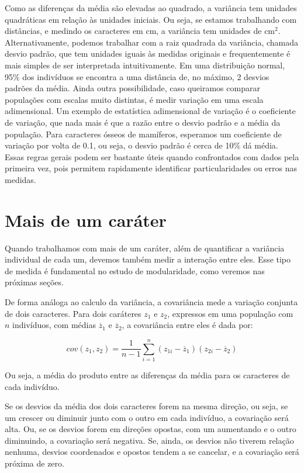 \documentclass[portuges,]{tufte-handout}
\begin{document}
Como as diferenças da média são elevadas ao quadrado, a variância tem
unidades quadráticas em relação às unidades iniciais. Ou seja, se
estamos trabalhando com distâncias, e medindo os caracteres em cm, a
variância tem unidades de cm$^2$. Alternativamente, podemos trabalhar
com a raiz quadrada da variância, chamada desvio padrão, que tem
unidades iguais às medidas originais e frequentemente é mais simples de
ser interpretada intuitivamente. Em uma distribuição normal, 95\% dos
indivíduos se encontra a uma distância de, no máximo, 2 desvios padrões
da média. Ainda outra possibilidade, caso queiramos comparar populações
com escalas muito distintas, é medir variação em uma escala
adimensional. Um exemplo de estatística adimensional de variação é o
coeficiente de variação, que nada mais é que a razão entre o desvio
padrão e a média da população. Para caracteres ósseos de mamíferos,
esperamos um coeficiente de variação por volta de 0.1, ou seja, o desvio
padrão é cerca de 10\% dá média. Essas regras gerais podem ser bastante
úteis quando confrontados com dados pela primeira vez, pois permitem
rapidamente identificar particularidades ou erros nas medidas.

\section{Mais de um caráter}\label{mais-de-um-caruxe1ter}

Quando trabalhamos com mais de um caráter, além de quantificar a
variância individual de cada um, devemos também medir a interação entre
eles. Esse tipo de medida é fundamental no estudo de modularidade, como
veremos nas próximas seções.

De forma análoga ao calculo da variância, a covariância mede a variação
conjunta de dois caracteres. Para dois caráteres $z_1$ e $z_2$,
expressos em uma população com $n$ indivíduos, com médias
$\overline z_1$ e $\overline z_2$, a covariância entre eles é dada por:

\[
cov(z_1, z_2) = \frac{1}{n-1} \sum_{i=1}^n (z_{1i} - \overline z_1)(z_{2i} - \overline z_2)
\]

Ou seja, a média do produto entre as diferenças da média para os
caracteres de cada indivíduo.

Se os desvios da média dos dois caracteres forem na mesma direção, ou
seja, se um crescer ou diminuir junto com o outro em cada indivíduo, a
covariação será alta. Ou, se os desvios forem em direções opostas, com
um aumentando e o outro diminuindo, a covariação será negativa. Se,
ainda, os desvios não tiverem relação nenhuma, desvios coordenados e
opostos tendem a se cancelar, e a covariação será próxima de zero.
\end{document}
